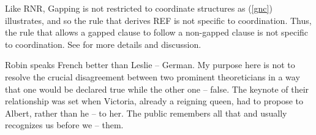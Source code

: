 \documentclass[output=paper
                ,modfonts
                ,nonflat
	        ,collection
	        ,collectionchapter
	        ,collectiontoclongg
 	        ,biblatex
                ,babelshorthands
                ,newtxmath
                ,draftmode
                ,colorlinks, citecolor=brown
]{./langsci/langscibook}
\begin{document}


Like RNR, Gapping is not restricted to coordinate structures as (\ref{gnc}) illustrates,
and so the rule that derives REF is not specific to coordination. Thus, the rule that allows a gapped clause to follow a non-gapped clause is not specific to coordination. See \citet{sangheepark} for more details and discussion.

\begin{exe}
\ex 
\begin{xlista}
\ex Robin speaks French better than Leslie -- German.
\ex My purpose here is not to resolve the crucial disagreement between two prominent theoreticians in a way that one would be declared true while the other one -- false.
\ex The keynote of their relationship was set when Victoria, already a reigning queen,
had to propose to Albert, rather than he -- to her.
\ex The public remembers all that and usually recognizes us before we -- them.\\
\citep[\S 2]{sangheepark}
\end{xlista}\label{gnc}
\end{exe}
\end{document}
